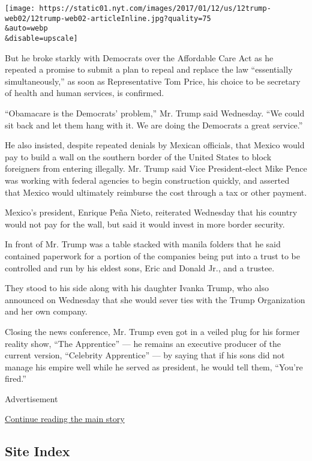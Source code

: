 \texttt{[image: https://static01.nyt.com/images/2017/01/12/us/12trump-web02/12trump-web02-articleInline.jpg?quality=75\\\&auto=webp\\\&disable=upscale]}

But he broke starkly with Democrats over the Affordable Care Act as he
repeated a promise to submit a plan to repeal and replace the law
``essentially simultaneously,'' as soon as Representative Tom Price, his
choice to be secretary of health and human services, is confirmed.

``Obamacare is the Democrats' problem,'' Mr. Trump said Wednesday. ``We
could sit back and let them hang with it. We are doing the Democrats a
great service.''

He also insisted, despite repeated denials by Mexican officials, that
Mexico would pay to build a wall on the southern border of the United
States to block foreigners from entering illegally. Mr. Trump said Vice
President-elect Mike Pence was working with federal agencies to begin
construction quickly, and asserted that Mexico would ultimately
reimburse the cost through a tax or other payment.

Mexico's president, Enrique Peña Nieto, reiterated Wednesday that his
country would not pay for the wall, but said it would invest in more
border security.

In front of Mr. Trump was a table stacked with manila folders that he
said contained paperwork for a portion of the companies being put into a
trust to be controlled and run by his eldest sons, Eric and Donald Jr.,
and a trustee.

They stood to his side along with his daughter Ivanka Trump, who also
announced on Wednesday that she would sever ties with the Trump
Organization and her own company.

Closing the news conference, Mr. Trump even got in a veiled plug for his
former reality show, ``The Apprentice'' --- he remains an executive
producer of the current version, ``Celebrity Apprentice'' --- by saying
that if his sons did not manage his empire well while he served as
president, he would tell them, ``You're fired.''

Advertisement

\protect\hyperlink{after-bottom}{Continue reading the main story}

\hypertarget{site-index}{%
\subsection{Site Index}\label{site-index}}

